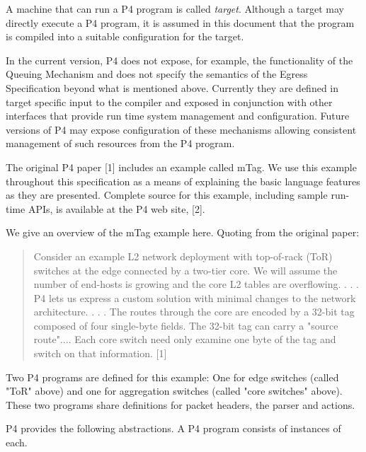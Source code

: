 \documentclass[12pt]{article}
\begin{document}
A machine that can run a P4 program is called \textit{target}. Although a target 
may directly execute a P4 program, it is assumed in this document that the 
program is compiled into a suitable configuration for the target.

In the current version, P4 does not expose, for example, the functionality 
of the Queuing Mechanism and does not specify the semantics of the Egress 
Specification beyond what is mentioned above. Currently they are defined in 
target specific input to the compiler and exposed in conjunction with other 
interfaces that provide run time system management and configuration. Future 
versions of P4 may expose configuration of these mechanisms allowing consistent 
management of such resources from the P4 program.


The original P4 paper [1] includes an example called mTag. We use this example 
throughout this specification as a means of explaining the basic language 
features as they are presented. Complete source for this example, including 
sample run-time APIs, is available at the P4 web site, [2].

We give an overview of the mTag example here.  Quoting from the original paper:

\begin{quote}
Consider an example L2 network deployment with top-of-rack (ToR) switches 
at the edge connected by a two-tier core. We will assume the number of end-hosts 
is growing and the core L2 tables are overflowing. . . .  P4 lets us express a 
custom solution with minimal changes to the network architecture. . . . The routes 
through the core are encoded by a 32-bit tag composed of four single-byte 
fields.  The 32-bit tag can carry a "source route".... Each core switch need 
only examine one byte of the tag and switch on that information. [1]
\end{quote}

Two P4 programs are defined for this example: One for edge switches (called 
"ToR" above) and one for aggregation switches (called "core switches" above). 
These two programs share definitions for packet headers, the parser and actions.


P4 provides the following abstractions. A P4 program consists of instances 
of each.
\end{document}
